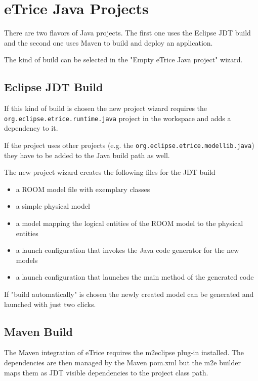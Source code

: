 \section{eTrice Java Projects}

There are two flavors of \eTrice{} Java projects. The first one uses the Eclipse JDT build and the
second one uses Maven to build and deploy an \eTrice{} application.

The kind of build can be selected in the "Empty eTrice Java project" wizard.

\subsection{Eclipse JDT Build}

If this kind of build is chosen the \eTrice{} new project wizard requires the \texttt{org.eclipse.etrice.runtime.java}
project in the workspace and adds a dependency to it.

If the project uses other \eTrice{} projects (e.g. the \texttt{org.eclipse.etrice.modellib.java})
they have to be added to the Java build path as well.

The \eTrice{} new project wizard creates the following files for the JDT build
\begin{itemize}
\item a ROOM model file with exemplary classes
\item a simple physical model
\item a model mapping the logical entities of the ROOM model to the physical entities
\item a launch configuration that invokes the \eTrice{} Java code generator for the new models
\item a launch configuration that launches the main method of the generated code
\end{itemize}

If "build automatically" is chosen the newly created model can be generated and launched with just two clicks.

\subsection{Maven Build}

The Maven integration of eTrice requires the m2eclipse plug-in installed. The dependencies are then managed
by the Maven pom.xml but the m2e builder maps them as JDT visible dependencies to the project class path.


